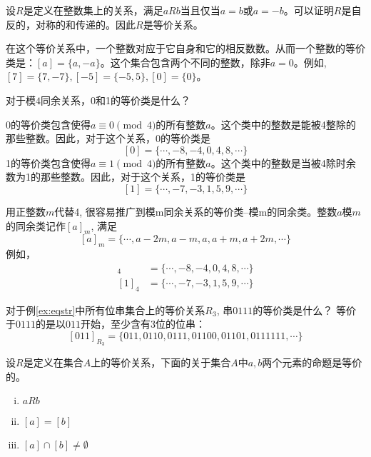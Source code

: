 \begin{example}
	设$R$是定义在整数集上的关系，满足$aRb$当且仅当$a=b$或$a=-b$。可以证明$R$是自反的，对称的和传递的。因此$R$是等价关系。
	
	在这个等价关系中，一个整数对应于它自身和它的相反数数。从而一个整数的等价类是：$[a]=\{a,-a\}$。这个集合包含两个不同的整数，除非$a=0$。例如, $[7]=\{7,-7\},[-5]=\{-5,5\},[0]=\{0\}$。
\end{example}

\begin{example}
	对于模$4$同余关系，0和1的等价类是什么？
	
	0的等价类包含使得$a\equiv 0\pmod{4}$的所有整数$a$。这个类中的整数是能被4整除的那些整数。因此，对于这个关系，0的等价类是
	\[ [0]=\{\cdots,-8,-4,0,4,8,\cdots \}\]
	1的等价类包含使得$a\equiv 1\pmod{4}$的所有整数$a$。这个类中的整数是当被4除时余数为1的那些整数。因此，对于这个关系，1的等价类是
	\[ [1]=\{\cdots,-7,-3,1,5,9,\cdots \}\]
	
	用正整数$m$代替4, 很容易推广到模m同余关系的等价类--模m的同余类。整数$a$模$m$的同余类记作$[a]_m$, 满足
	\[ [a]_m=\{\cdots,a-2m,a-m,a,a+m,a+2m,\cdots \}\] 
	例如，
	\begin{align*}
		[0]_4 &=\{\cdots,-8,-4,0,4,8,\cdots \} \\
		[1]_4 &=\{\cdots,-7,-3,1,5,9,\cdots \} 
	\end{align*}
		
\end{example}

\begin{example}
	对于例\ref{ex:eqstr}中所有位串集合上的等价关系$R_3$, 串$0111$的等价类是什么？
	等价于$0111$的是以$011$开始，至少含有3位的位串：
	\[[011]_{R_3}=\{011,0110,0111,01100,01101,0111111,\cdots\}\]
\end{example}

\begin{theorem} \label{theorem:eqPro}
	设$R$是定义在集合$A$上的等价关系，下面的关于集合$A$中$a,b$两个元素的命题是等价的。
	\begin{enumerate}[(i) ]
		\item $aRb$
		\item $[a]=[b]$
		\item $[a]\cap [b]\ne\emptyset$
	\end{enumerate}
\end{theorem}


